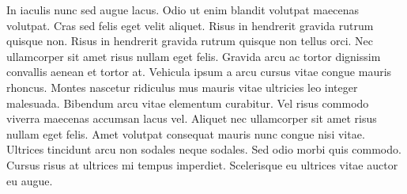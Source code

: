 In iaculis nunc sed augue lacus. Odio ut enim blandit volutpat maecenas volutpat. Cras sed felis eget velit aliquet. Risus in hendrerit gravida rutrum quisque non. Risus in hendrerit gravida rutrum quisque non tellus orci. Nec ullamcorper sit amet risus nullam eget felis. Gravida arcu ac tortor dignissim convallis aenean et tortor at. Vehicula ipsum a arcu cursus vitae congue mauris rhoncus. Montes nascetur ridiculus mus mauris vitae ultricies leo integer malesuada. Bibendum arcu vitae elementum curabitur. Vel risus commodo viverra maecenas accumsan lacus vel. Aliquet nec ullamcorper sit amet risus nullam eget felis. Amet volutpat consequat mauris nunc congue nisi vitae. Ultrices tincidunt arcu non sodales neque sodales. Sed odio morbi quis commodo. Cursus risus at ultrices mi tempus imperdiet. Scelerisque eu ultrices vitae auctor eu augue.\\